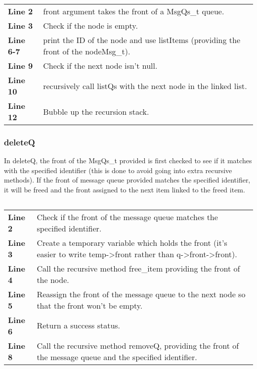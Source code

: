 \documentclass[a4paper, 12pt, titlepage]{article}
\newenvironment{code}{\captionsetup{type=listing}}{}
\newcommand{\sourcecode}[3]{
    \begin{code}
      \inputminted[linenos,numbersep=5pt,gobble=0,frame=lines,framesep=2mm,]{c}{#1}
        \caption{#2}
        \label{lst: #3}
    \end{code}
}
\begin{document}
\begin{onehalfspacing}
  \sourcecode{snippets/task2b/listQs.c}{listQs method implementation}{listQs}
  \begin{longtable}{l p{10cm}}
    \textbf{Line 2} & front argument takes the front of a MsgQs\_t queue. \\
    \textbf{Line 3} & Check if the node is empty. \\
    \textbf{Line 6-7} &  print the ID of the node and use listItems (providing the front of  the nodeMsg\_t). \\
    \textbf{Line 9} & Check if the next node isn't null. \\
    \textbf{Line 10} & recursively call listQs with the next node in the linked list.\\
    \textbf{Line 12} & Bubble up the recursion stack. \\
  \end{longtable}

  \clearpage

  \subsubsection{deleteQ}
  In deleteQ, the front of the MsgQs\_t provided is first checked to see if it matches with the specified identifier (this is done to avoid going into extra recursive methods). If the front of message queue provided matches the specified identifier, it will be freed and the front assigned to the next item linked to the freed item.
  \sourcecode{snippets/task2b/deleteQ.c}{deleteQ method implementation}{task2b_deleteQ}

  \begin{longtable}{l p{10cm}}
    \textbf{Line 2} & Check if the front of the message queue matches the specified identifier. \\
    \textbf{Line 3} & Create a temporary variable which holds the front (it's easier to write temp->front rather than q->front->front). \\
    \textbf{Line 4} &  Call the recursive method free\_item providing the front of the node. \\
    \textbf{Line 5} & Reassign the front of the message queue to the next node so that the front won't be empty. \\
    \textbf{Line 6} & Return a success status.\\
    \textbf{Line 8} & Call the recursive method removeQ, providing the front of the message queue and the specified identifier. \\
  \end{longtable}


\end{onehalfspacing}
\end{document}
